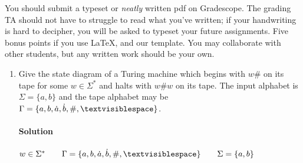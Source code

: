 \documentclass[11pt]{article}
\newcommand{\solution}[1]{\paragraph{Solution}  }
\begin{document}

You should submit a typeset or \emph{neatly} written pdf on Gradescope.  The grading TA should not have to struggle to read what you've written; if your handwriting is hard to decipher, you will be asked to typeset your future assignments. Five bonus points if you use \LaTeX, and our template. You may collaborate with other students, but any written work should be your own. 

\begin{enumerate}
    \item Give the state diagram of a Turing machine which begins with $w\#$ on its tape for some $w \in \Sigma^*$ and halts with $w\#w$ on its tape. The input alphabet is $\Sigma = \{a,b\}$ and the tape alphabet may be $\Gamma = \{a,b,\dot{a}, \dot{b},\#,\textvisiblespace\}$.

    \solution{}

    $w \in \Sigma^* \qquad \Gamma = \{a,b,\dot{a}, \dot{b}, \#, \textvisiblespace\} \qquad \Sigma = \{a, b\}$

    \begin{figure}[ht]
        \centering
\end{figure}
\end{enumerate}
\end{document}
